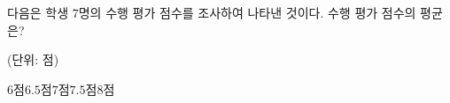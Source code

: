 다음은 학생 $7$명의 수행 평가 점수를 조사하여 나타낸 것이다. 수행 평가 점수의 평균은?\par\noindent\hfill{\footnotesize (단위: 점)}
\begin{choices32}{$6$점}{$6.5$점}{$7$점}{$7.5$점}{$8$점}\end{choices32}
